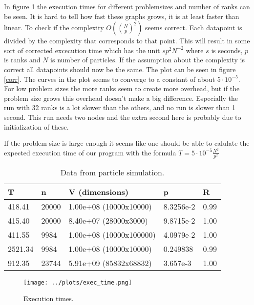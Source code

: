 \documentclass[a4paper,11pt]{article}
\begin{document}
In figure \ref{exec} the execution times for different problemsizes and number of ranks can be seen.
It is hard to tell how fast these graphs grows, it is at least faster than linear.
To check if the complexity $O((\frac{N}{p})^2)$ seems correct.
Each datapoint is divided by the complexity that corresponds to that point.
This will result in some sort of corrected excecution time which has the unit $sp^2N^{-2}$ where $s$ is seconds, $p$ is ranks and $N$ is number of particles.
If the assumption about the complexity is correct all datapoints should now be the same.
The plot can be seen in figure \ref{corr}.
The curves in the plot seems to converge to a constant of about $5 \cdot 10^{-5}$.
For low problem sizes the more ranks seem to create more overhead, but if the problem size grows this overhead doesn't make a big difference.
Especially the run with 32 ranks is a lot slower than the others, and no run is slower than 1 second.
This run needs two nodes and the extra second here is probably due to initialization of these.

If the problem size is large enough it seems like one should be able to calulate the expected execution time of our program with the formula $T = 5 \cdot 10^{-5} \frac{N^2}{p^2}$


\begin{table}[h!]
  \begin{center}
  \caption{Data from particle simulation.}
  \label{data}
  \begin{tabular}[h]{|l|l|l|l|l|}
    \hline
    T       & n     & V (dimensions)         & p          & R\\
    \hline
    418.41  & 20000 & 1.00e+08 (10000x10000) & 8.3256e-2  & 0.99 \\ 
    415.40  & 20000 & 8.40e+07 (28000x3000)  & 9.8715e-2  & 1.00 \\ 
    411.55  & 9984  & 1.00e+08 (10000x100000)& 4.0979e-2  & 1.00 \\ 
    2521.34 & 9984  & 1.00e+08 (10000x10000) & 0.249838   & 0.99 \\
    912.35  & 23744 & 5.91e+09 (85832x68832) & 3.657e-3   & 1.00 \\
    \hline
  \end{tabular}
  \end{center}
\end{table}

\begin{figure}[!h]
  \caption{Execution times.}
  \label{exec}
  \texttt{[image: ../plots/exec\_time.png]}
\end{figure}
\end{document}

